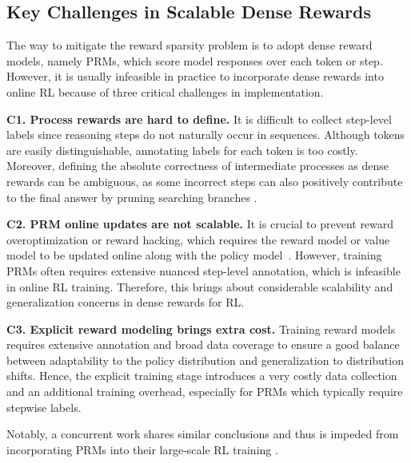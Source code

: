 \subsection{Key Challenges in Scalable Dense Rewards}
\label{sec:challenges}
The way to mitigate the reward sparsity problem is to adopt dense reward models, namely PRMs, which score model responses over each token or step.
However, it is usually infeasible in practice to incorporate dense rewards into online RL because of three critical challenges in implementation.


\textbf{C1. Process rewards are hard to define.}
It is difficult to collect step-level labels since reasoning steps do not naturally occur in sequences. Although tokens are easily distinguishable, annotating labels for each token is too costly.
Moreover, defining the absolute correctness of intermediate processes as dense rewards can be ambiguous, as some incorrect steps can also positively contribute to the final answer by pruning searching branches \citep{Openai2024OpenAIOS,deepseekai2025deepseekr1incentivizingreasoningcapability}. 


\textbf{C2. PRM online updates are not scalable.}
It is crucial to prevent reward overoptimization or reward hacking, which requires the reward model or value model to be updated online along with the policy model~\citep{schulman2017proximal,Gao2022ScalingLF}. 
However, training PRMs often requires extensive nuanced step-level annotation, which is infeasible in online RL training.
Therefore, this brings about considerable scalability and generalization concerns in dense rewards for RL.

\textbf{C3. Explicit reward modeling brings extra cost.}
Training reward models requires extensive annotation and broad data coverage to ensure a good balance between adaptability to the policy distribution and generalization to distribution shifts.
Hence, the explicit training stage introduces a very costly data collection and an additional training overhead, especially for PRMs which typically require stepwise labels.

Notably, a concurrent work shares similar conclusions and thus is impeded from incorporating PRMs into their large-scale RL training \citep{deepseekai2025deepseekr1incentivizingreasoningcapability}.
